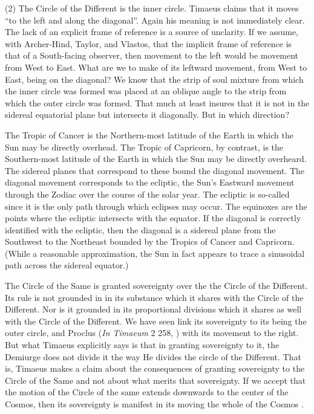 (2) The Circle of the Different is the inner circle. Timaeus claims that it moves ``to the left and along the diagonal''. Again his meaning is not immediately clear. The lack of an explicit frame of reference is a source of unclarity. If we assume, with Archer-Hind, Taylor, and Vlastos, that the implicit frame of reference is that of a South-facing observer, then movement to the left would be movement from West to East. What are we to make of its leftward movement, from West to East, being on the diagonal? We know that the strip of soul mixture from which the inner circle was formed was placed at an oblique angle to the strip from which the outer circle was formed. That much at least insures that it is not in the sidereal equatorial plane but intersects it diagonally. But in which direction?

The Tropic of Cancer is the Northern-most latitude of the Earth in which the Sun may be directly overhead. The Tropic of Capricorn, by contrast, is the Southern-most latitude of the Earth in which the Sun may be directly overheard. The sidereal planes that correspond to these bound the diagonal movement. The diagonal movement corresponds to the ecliptic, the Sun's Eastward movement through the Zodiac over the course of the solar year. The ecliptic is so-called since it is the only path through which eclipses may occur. The equinoxes are the points where the ecliptic intersects with the equator. If the diagonal is correctly identified with the ecliptic, then the diagonal is a sidereal plane from the Southwest to the Northeast bounded by the Tropics of Cancer and Capricorn. (While a reasonable approximation, the Sun in fact appears to trace a sinusoidal path across the sidereal equator.)

The Circle of the Same is granted sovereignty over the the Circle of the Different. Its rule is not grounded in in its substance which it shares with the Circle of the Different. Nor is it grounded in its proportional divisions which it shares as well with the Circle of the Different. We have seen \citet[112 n3]{Archer-Hind:1888qd} link its sovereignty to its being the outer circle, and Proclus (\emph{In Timaeum} 2 258, \citealt{Diehl:1903re}) with its movement to the right. But what Timaeus explicitly says is that in granting sovereignty to it, the Demiurge does not divide it the way He divides the circle of the Different. That is, Timaeus makes a claim about the consequences of granting sovereignty to the Circle of the Same and not about what merits that sovereignty. If we accept that the motion of the Circle of the same extends downwards to the center of the Cosmos, then its sovereignty is manifest in its moving the whole of the Cosmos \citep[76]{Cornford:1935fk}.

